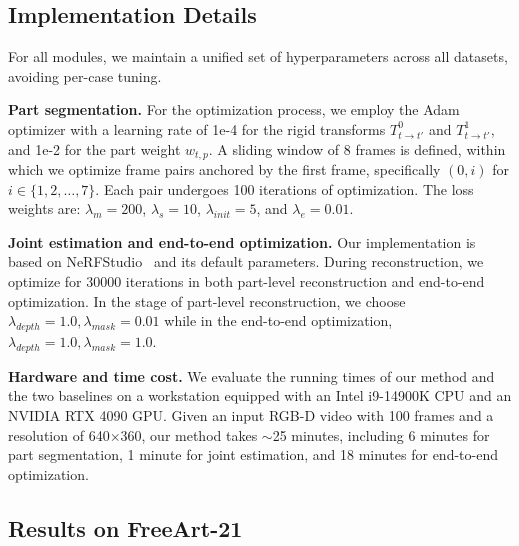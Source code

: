 \subsection{Implementation Details}

For all modules, we maintain a unified set of hyperparameters across all datasets, avoiding per-case tuning.

\noindent\textbf{Part segmentation.} For the optimization process, we employ the Adam optimizer with a learning rate of 1e-4 for the rigid transforms $T^0_{t\to t'}$ and $T^1_{t\to t'}$, and 1e-2 for the part weight $w_{t,p}$. 
A sliding window of 8 frames is defined, within which we optimize frame pairs anchored by the first frame, 
specifically $(0, i)$ for $i \in \{1, 2, \dots, 7\}$. Each pair undergoes 100 iterations of optimization. 
The loss weights are: $\lambda_m=200$, $\lambda_s=10$, $\lambda_{init}=5$, and $\lambda_{e}=0.01$.

\noindent\textbf{Joint estimation and end-to-end optimization.} Our implementation is based on NeRFStudio~\cite{nerfstudio} and its default parameters. During reconstruction, we optimize for 30000 iterations in both part-level reconstruction and end-to-end optimization. In the stage of part-level reconstruction, we choose $\lambda_{depth}=1.0, \lambda_{mask}=0.01$ while in the end-to-end optimization, $\lambda_{depth}=1.0, \lambda_{mask}=1.0$.

\noindent\textbf{Hardware and time cost.} We evaluate the running times of our method and the two baselines on a workstation equipped with an Intel i9-14900K CPU and an NVIDIA RTX 4090 GPU. Given an input RGB-D video with 100 frames and a resolution of 640$\times$360, our method takes $\sim$25 minutes, including 6 minutes for part segmentation, 1 minute for joint estimation, and 18 minutes for end-to-end optimization. 
\subsection{Results on FreeArt-21}

